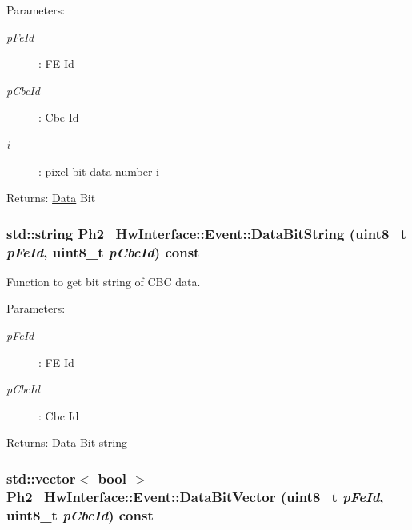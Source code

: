 \begin{Desc}
\item[Parameters:]
\begin{description}
\item[{\em p\-Fe\-Id}]: FE Id \item[{\em p\-Cbc\-Id}]: Cbc Id \item[{\em i}]: pixel bit data number i \end{description}
\end{Desc}
\begin{Desc}
\item[Returns:]\hyperlink{class_ph2___hw_interface_1_1_data}{Data} Bit \end{Desc}
\hypertarget{class_ph2___hw_interface_1_1_event_db005c7fbcd56f6cb66a4b83b185886b}{
\subsubsection[DataBitString]{\setlength{\rightskip}{0pt plus 5cm}std::string Ph2\_\-Hw\-Interface::Event::Data\-Bit\-String (uint8\_\-t {\em p\-Fe\-Id}, uint8\_\-t {\em p\-Cbc\-Id}) const}}
\label{class_ph2___hw_interface_1_1_event_db005c7fbcd56f6cb66a4b83b185886b}


Function to get bit string of CBC data. 

\begin{Desc}
\item[Parameters:]
\begin{description}
\item[{\em p\-Fe\-Id}]: FE Id \item[{\em p\-Cbc\-Id}]: Cbc Id \end{description}
\end{Desc}
\begin{Desc}
\item[Returns:]\hyperlink{class_ph2___hw_interface_1_1_data}{Data} Bit string \end{Desc}
\hypertarget{class_ph2___hw_interface_1_1_event_54db44c9de8f4ca816d8cadcaa733260}{
\subsubsection[DataBitVector]{\setlength{\rightskip}{0pt plus 5cm}std::vector$<$ bool $>$ Ph2\_\-Hw\-Interface::Event::Data\-Bit\-Vector (uint8\_\-t {\em p\-Fe\-Id}, uint8\_\-t {\em p\-Cbc\-Id}) const}}
\label{class_ph2___hw_interface_1_1_event_54db44c9de8f4ca816d8cadcaa733260}


